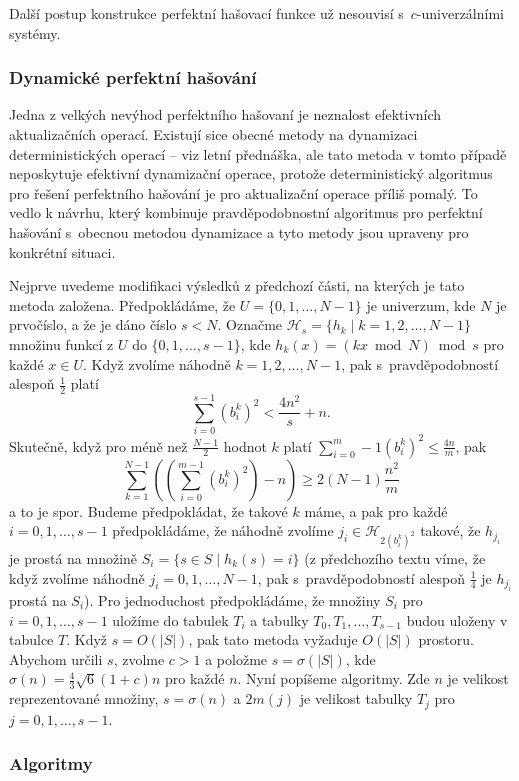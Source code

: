\documentclass[a4paper,12pt]{article}
\begin{document}
Další postup konstrukce perfektní hašovací funkce už 
nesouvisí s~$c$-univerzálními systémy. 

\subsubsection{Dynamické perfektní hašování}

Jedna z velkých nevýhod perfektního hašovaní je 
neznalost efektivních aktualizačních ope\-rací. Existují sice 
obecné meto\-dy na dynamizaci deterministických operací -- viz 
letní přednáš\-ka, ale tato metoda v tomto případě neposkytuje 
efektivní dynamizační operace, protože deterministický 
algoritmus pro ře\-še\-ní perfektního hašování je pro 
aktualizační ope\-race příliš pomalý. To vedlo k návrhu, 
který kombinuje pravděpodobnostní algoritmus pro perfektní 
hašování s~obecnou metodou dynami\-za\-ce a tyto metody jsou 
upraveny pro konkrétní situaci. 

Nejprve uvedeme modifikaci výsledků z 
předchozí části, na kterých je tato metoda založena.
Předpokládáme, že $U=\{0,1,\dots,N-1\}$ je univerzum, kde $
N$ je 
prvočíslo, a že je dáno číslo $s<N$. Označme 
$\mathcal H_s=\{h_k\mid k=1,2,\dots,N-1\}$ množinu funkcí z $U$ do 
$\{0,1,\dots,s-1\}$, kde $h_k(x)=(kx\bmod N)\bmod s$ pro každé $
x\in U$. 
Když zvolíme náhodně $k=1,2,\dots,N-1$, pak s~pravděpodobností 
ales\-poň $\frac 12$ platí 
$$\sum_{i=0}^{s-1}(b_i^k)^2<\frac {4n^2}s+n.$$
Skutečně, když pro méně než $\frac{N-1}2$ hodnot $k$ platí $\sum_{i=0}^m-1(b^k_i)^2\le\frac{4n}m$, pak 
$$\sum_{k=1}^{N-1}\left((\sum_{i=0}^{m-1}(b^k_i)^2)-n\right)\ge2(N-1)\frac{n^2}m$$ 
a to je spor. Budeme předpokládat, 
že takové $k$ máme, a pak pro každé $i=0,1,\dots,s-1$ 
předpokládáme, že náhodně zvolíme $j_i\in \mathcal H_{
2(b_i^k)^2}$ takové, že 
$h_{j_i}$ je prostá na množině $S_i=\{s\in S\mid h_k(s)=i
\}$ (z předchozího textu víme, že když zvolíme náhodně 
$j_i=0,1,\dots,N-1$, pak s~pravděpodobností ales\-poň $\frac 
14$ je $h_{j_i}$ prostá na $S_i$). Pro jednoduchost předpokládáme, že množiny $
S_i$ 
pro $i=0,1,\dots,s-1$ uložíme do tabulek $T_i$ a tabulky 
$T_0,T_1,\dots,T_{s-1}$ budou uloženy v tabulce $T$. Když $
s=O(|S|)$, 
pak tato metoda vyžaduje $O(|S|)$ prostoru. Abychom určili $
s$, 
zvolme $c>1$ a položme $s=\sigma (|S|)$, kde $\sigma (n)=\frac 
43\sqrt 6(1+c)n$ pro 
každé $n$. Nyní popíšeme algoritmy. Zde $n$ je velikost reprezentované množiny, $s=\sigma(n)$ a $2m(j)$ je velikost tabulky $T_j$ pro $j=0,1,\dots,s-1$.

\subsubsection{Algoritmy}
\end{document}
